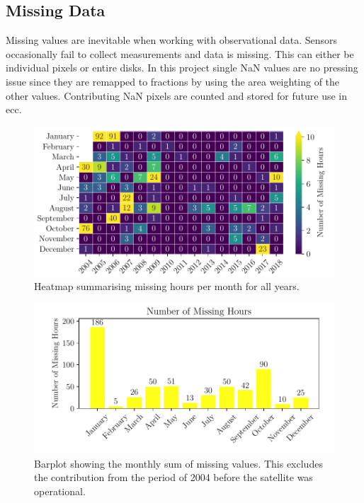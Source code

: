 \subsection{Missing Data} \label{sec:missing_values}
Missing values are inevitable when working with observational data. Sensors occasionally fail to collect measurements and data is missing. This can either be individual pixels or entire disks. In this project single NaN values are no pressing issue since they are remapped to fractions by using the area weighting of the other values. Contributing NaN pixels are counted and stored for future use in \acrshort{ecc}.
\begin{figure}
    \centering
    \includegraphics[scale = 1.0]{python_figs/heatmap_missing_values.pdf}
    \caption{Heatmap summarising missing hours per month for all years.}
    \label{fig:heatmap_missing_values}
\end{figure}
\begin{figure}
    \centering
    \includegraphics[scale = 1.0]{python_figs/heatmap_missing_values_monthly_sum.pdf}
    \caption{Barplot showing the monthly sum of missing values. This excludes the contribution from the period of 2004 before the satellite was operational.}
    \label{fig:barplot_missing_values}
\end{figure}
